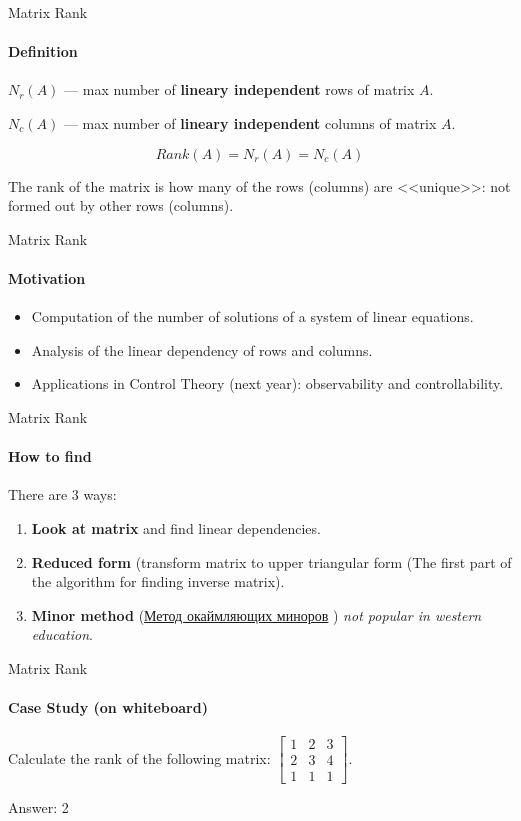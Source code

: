 \documentclass[aspectratio=169]{beamer}
\begin{document}
\begin{frame}[t]{Matrix Rank}
    \framesubtitle{Definition}
        \textbf{$N_r(A)$} --- max number of \textbf{lineary independent} rows of matrix $A$.
    
        \textbf{$N_c(A)$} --- max number of \textbf{lineary independent} columns of matrix $A$.
    
        \begin{equation*}
            Rank(A) = N_r(A) = N_c(A)
        \end{equation*}
    \bigskip
    
        \centering
        The rank of the matrix is how many of the rows (columns) are <<unique>>: not formed out by other rows (columns).
    \end{frame}
    
    \begin{frame}[t]{Matrix Rank}
    \framesubtitle{Motivation}
        \begin{itemize}
            \item Computation of the number of solutions of a system of linear equations.
            \item Analysis of the linear dependency of rows and columns.
            \item Applications in Control Theory (next year): observability and controllability.
        \end{itemize}
    \end{frame}
    
    \begin{frame}[t]{Matrix Rank}
    \framesubtitle{How to find}
        There are 3 ways:
        \begin{enumerate}
            \item \textbf{Look at matrix} and find linear dependencies.
            \item \textbf{Reduced form} (transform matrix to upper triangular form (The first part of the algorithm for finding inverse matrix).
            \item \textbf{Minor method} (\href{http://www.mathprofi.ru/rang_matricy.html}{Метод окаймляющих миноров} ) \textit{not popular in western education}.
        \end{enumerate}
    \end{frame}


\begin{frame}[t]{Matrix Rank}
\framesubtitle{Case Study (on whiteboard)}
Calculate the rank of the following matrix: $\begin{bmatrix}1&2&3\\2&3&4\\1&1&1\end{bmatrix}$. \medskip

\alert{\Large Answer: 2}
\end{frame}
\end{document}

